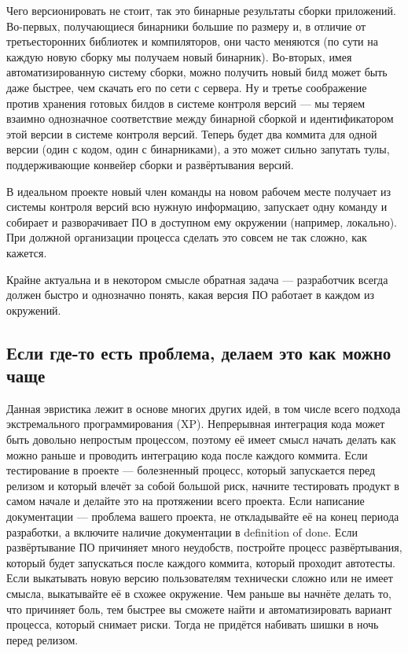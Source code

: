 \documentclass{../../text-style}
\begin{document}
Чего версионировать не стоит, так это бинарные результаты сборки приложений. Во-первых, получающиеся бинарники большие по размеру и, в отличие от третьесторонних библиотек и компиляторов, они часто меняются (по сути на каждую новую сборку мы получаем новый бинарник). Во-вторых, имея автоматизированную систему сборки, можно получить новый билд может быть даже быстрее, чем скачать его по сети с сервера. Ну и третье соображение против хранения готовых билдов в системе контроля версий --- мы теряем взаимно однозначное соответствие между бинарной сборкой и идентификатором этой версии в системе контроля версий. Теперь будет два коммита для одной версии (один с кодом, один с бинарниками), а это может сильно запутать тулы, поддерживающие конвейер сборки и развёртывания версий.

В идеальном проекте новый член команды на новом рабочем месте получает из системы контроля версий всю нужную информацию, запускает одну команду и собирает и разворачивает ПО в доступном ему окружении (например, локально). При должной организации процесса сделать это совсем не так сложно, как кажется.

Крайне актуальна и в некотором смысле обратная задача --- разработчик всегда должен быстро и однозначно понять, какая версия ПО работает в каждом из окружений.

\subsection{Если где-то есть проблема, делаем это как можно чаще}

Данная эвристика лежит в основе многих других идей, в том числе всего подхода экстремального программирования (XP). Непрерывная интеграция кода может быть довольно непростым процессом, поэтому её имеет смысл начать делать как можно раньше и проводить интеграцию кода после каждого коммита. Если тестирование в проекте --- болезненный процесс, который запускается перед релизом и который влечёт за собой большой риск, начните тестировать продукт в самом начале и делайте это на протяжении всего проекта. Если написание документации --- проблема вашего проекта, не откладывайте её на конец периода разработки, а включите наличие документации в definition of done. Если развёртывание ПО причиняет много неудобств, постройте процесс развёртывания, который будет запускаться после каждого коммита, который проходит автотесты. Если выкатывать новую версию пользователям технически сложно или не имеет смысла, выкатывайте её в схожее окружение. Чем раньше вы начнёте делать то, что причиняет боль, тем быстрее вы сможете найти и автоматизировать вариант процесса, который снимает риски. Тогда не придётся набивать шишки в ночь перед релизом.
\end{document}
